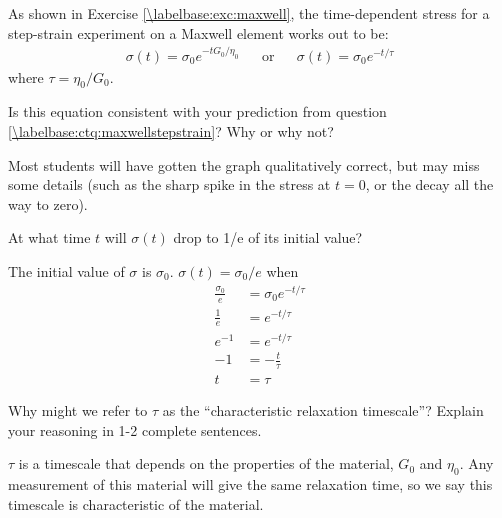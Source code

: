 \begin{activity}
\begin{infobox}
	As shown in Exercise \ref{\labelbase:exc:maxwell}, the time-dependent stress for a step-strain experiment on a Maxwell element works out to be:
	\begin{align*}
		\sigma(t) = \sigma_0 e^{-t G_0/\eta_0}  && \text{or} && \sigma(t) = \sigma_0 e^{-t /\tau}
	\end{align*}
	where $\tau = \eta_0/G_0$.
\end{infobox}

\begin{ctqs}
	
	\question Is this equation consistent with your prediction from question \ref{\labelbase:ctq:maxwellstepstrain}?  Why or why not?
	
					\begin{solution}[1.5in]
					
						Most students will have gotten the graph qualitatively correct, but may miss some details (such as the sharp spike in the stress at $t=0$, or the decay all the way to zero).
					
					\end{solution}
		
	\question At what time $t$ will $\sigma(t)$ drop to 1/e of its initial value?
	
					\begin{solution}[1.5in]
						The initial value of $\sigma$ is $\sigma_0$.  $\sigma(t) = \sigma_0/e$ when
						\begin{align*}
							\frac{\sigma_0}{e} &= \sigma_0 e^{-t/\tau} \\
							\frac{1}{e} &= e^{-t/\tau}\\
							e^{-1} &= e^{-t/\tau}\\
							-1 &= -\frac{t}{\tau} \\
							t &= \tau
						\end{align*}
					\end{solution}
		
		\question Why might we refer to $\tau$ as the ``characteristic relaxation timescale''?  Explain your reasoning in 1-2 complete sentences.
	
					\begin{solution}[1.5in]
					
						$\tau$ is a timescale that depends on the properties of the material, $G_0$ and $\eta_0$.  Any measurement of this material will give the same relaxation time, so we say this timescale is characteristic of the material.
					

\end{solution}
\end{ctqs}
\end{activity}
